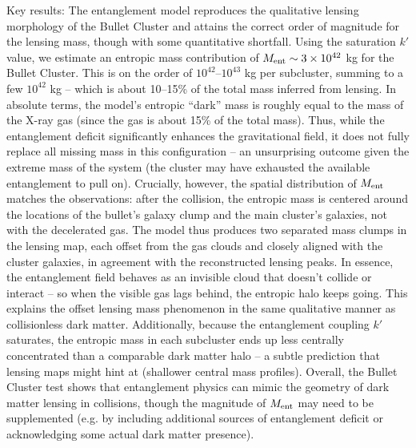 \documentclass[11pt]{article}
\begin{document}
Key results: The entanglement model reproduces the qualitative lensing morphology of the Bullet Cluster and attains the correct order of magnitude for the lensing mass, though with some quantitative shortfall. Using the saturation $k'$ value, we estimate an entropic mass contribution of $M_{\rm ent}\sim 3\times10^{42}$ kg for the Bullet Cluster. This is on the order of $10^{42}$–$10^{43}$ kg per subcluster, summing to a few $10^{42}$ kg – which is about 10–15\% of the total mass inferred from lensing. In absolute terms, the model’s entropic “dark” mass is roughly equal to the mass of the X-ray gas (since the gas is about 15\% of the total mass). Thus, while the entanglement deficit significantly enhances the gravitational field, it does not fully replace all missing mass in this configuration – an unsurprising outcome given the extreme mass of the system (the cluster may have exhausted the available entanglement to pull on). Crucially, however, the spatial distribution of $M_{\rm ent}$ matches the observations: after the collision, the entropic mass is centered around the locations of the bullet’s galaxy clump and the main cluster’s galaxies, not with the decelerated gas. The model thus produces two separated mass clumps in the lensing map, each offset from the gas clouds and closely aligned with the cluster galaxies, in agreement with the reconstructed lensing peaks. In essence, the entanglement field behaves as an invisible cloud that doesn’t collide or interact – so when the visible gas lags behind, the entropic halo keeps going. This explains the offset lensing mass phenomenon in the same qualitative manner as collisionless dark matter. Additionally, because the entanglement coupling $k'$ saturates, the entropic mass in each subcluster ends up less centrally concentrated than a comparable dark matter halo – a subtle prediction that lensing maps might hint at (shallower central mass profiles). Overall, the Bullet Cluster test shows that entanglement physics can mimic the geometry of dark matter lensing in collisions, though the magnitude of $M_{\rm ent}$ may need to be supplemented (e.g. by including additional sources of entanglement deficit or acknowledging some actual dark matter presence).
\end{document}
